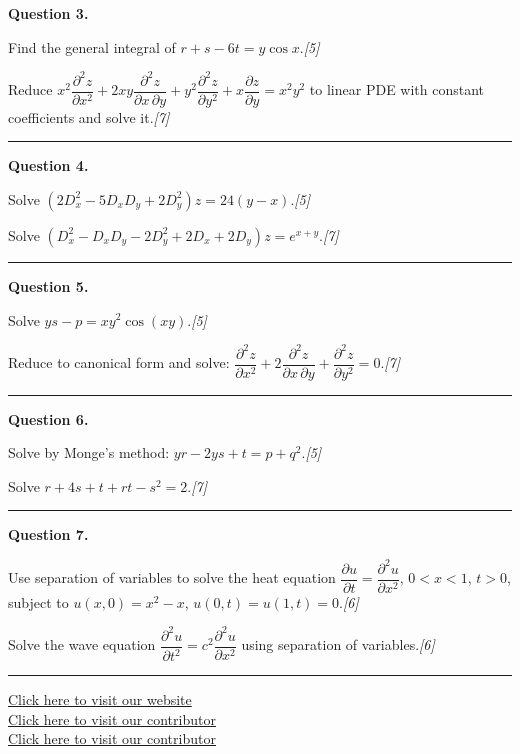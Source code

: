 \documentclass[11pt,a4paper]{article}
\newcommand{\pts}[1]{\hfill   \textit{[#1]}}
\begin{document}
\medskip


\noindent   \textbf{Question 3.}

\begin{parts}
  \item Find the general integral of $r+s-6t=y\cos x$.\pts{5}
  \item Reduce $x^2\dfrac{\partial^2 z}{\partial x^2}+2xy\dfrac{\partial^2 z}{\partial x\,\partial y}+y^2\dfrac{\partial^2 z}{\partial y^2}+x\dfrac{\partial z}{\partial y}=x^2y^2$ to linear PDE with constant coefficients and solve it.\pts{7}
\end{parts}
\medskip\rule{\linewidth}{0.2pt}

\medskip


\noindent   \textbf{Question 4.}

\begin{parts}
  \item Solve $(2D_x^2-5D_xD_y+2D_y^2)z=24(y-x)$.\pts{5}
  \item Solve $(D_x^2-D_xD_y-2D_y^2+2D_x+2D_y)z=e^{x+y}$.\pts{7}
\end{parts}
\medskip\rule{\linewidth}{0.2pt}

\medskip


\noindent   \textbf{Question 5.}

\begin{parts}
  \item Solve $ys-p=xy^2\cos(xy)$.\pts{5}
  \item Reduce to canonical form and solve: $\dfrac{\partial^2 z}{\partial x^2}+2\dfrac{\partial^2 z}{\partial x\,\partial y}+\dfrac{\partial^2 z}{\partial y^2}=0$.\pts{7}
\end{parts}
\medskip\rule{\linewidth}{0.2pt}

\medskip


\noindent   \textbf{Question 6.}

\begin{parts}
  \item Solve by Monge's method: $yr-2ys+t=p+q^2$.\pts{5}
  \item Solve $r+4s+t+rt-s^2=2$.\pts{7}
\end{parts}
\medskip\rule{\linewidth}{0.2pt}

\medskip


\noindent   \textbf{Question 7.}

\begin{parts}
  \item Use separation of variables to solve the heat equation $\dfrac{\partial u}{\partial t}=\dfrac{\partial^2 u}{\partial x^2}$, $0<x<1$, $t>0$, subject to $u(x,0)=x^2-x$, $u(0,t)=u(1,t)=0$.\pts{6}
  \item Solve the wave equation $\dfrac{\partial^2 u}{\partial t^2}=c^2\dfrac{\partial^2 u}{\partial x^2}$ using separation of variables.\pts{6}
\end{parts}

\vfill\rule{\linewidth}{0.4pt}

\begin{center}\small
\href{https://bhu-exam.vercel.app/}{Click here to visit our website}\\[4pt]
\href{https://me-aryan.vercel.app/}{Click here to visit our contributor}\\[4pt]
\href{https://quashan-me.vercel.app/}{Click here to visit our contributor}
\end{center}
\end{document}
